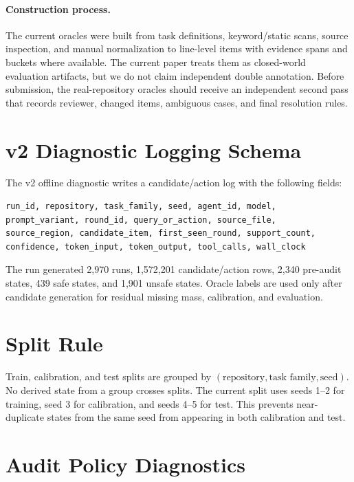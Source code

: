 \documentclass[letterpaper]{article}
\begin{document}
\paragraph{Construction process.}
The current oracles were built from task definitions, keyword/static scans,
source inspection, and manual normalization to line-level items with evidence
spans and buckets where available. The current paper treats them as closed-world
evaluation artifacts, but we do not claim independent double annotation. Before
submission, the real-repository oracles should receive an independent second
pass that records reviewer, changed items, ambiguous cases, and final resolution
rules.

\section{v2 Diagnostic Logging Schema}

The v2 offline diagnostic writes a candidate/action log with the following
fields:

\begin{lstlisting}
run_id, repository, task_family, seed, agent_id, model,
prompt_variant, round_id, query_or_action, source_file,
source_region, candidate_item, first_seen_round, support_count,
confidence, token_input, token_output, tool_calls, wall_clock
\end{lstlisting}

The run generated 2,970 runs, 1,572,201 candidate/action rows, 2,340 pre-audit
states, 439 safe states, and 1,901 unsafe states. Oracle labels are used only
after candidate generation for residual missing mass, calibration, and
evaluation.

\section{Split Rule}

Train, calibration, and test splits are grouped by
$(\text{repository}, \text{task family}, \text{seed})$. No derived state from a
group crosses splits. The current split uses seeds 1--2 for training, seed 3
for calibration, and seeds 4--5 for test. This prevents near-duplicate states
from the same seed from appearing in both calibration and test.

\section{Audit Policy Diagnostics}
\end{document}

